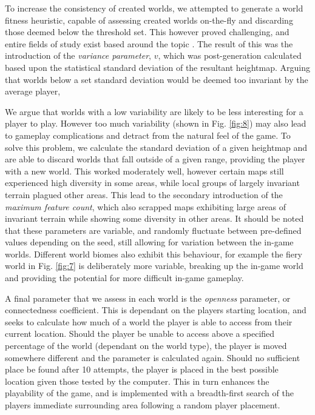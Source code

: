 \documentclass[12pt,a4paper]{article}
\begin{document}


To increase the consistency of created worlds, we attempted to generate a world fitness heuristic, capable of assessing created worlds on-the-fly and discarding those deemed below the threshold set. This however proved challenging, and entire fields of study exist based around the topic \cite{togelius2011search}. The result of this was the introduction of the \emph{variance parameter}, $v$, which was post-generation calculated based upon the statistical standard deviation of the resultant heightmap. Arguing that worlds below a set standard deviation would be deemed too invariant by the average player, 

We argue that worlds with a low variability are likely to be less interesting for a player to play. However too much variability (shown in Fig. \ref{fig:8}) may also lead to gameplay complications and detract from the natural feel of the game. To solve this problem, we calculate the standard deviation of a given heightmap and are able to discard worlds that fall outside of a given range, providing the player with a new world. This worked moderately well, however certain maps still experienced high diversity in some areas, while local groups of largely invariant terrain plagued other areas. This lead to the secondary introduction of the \emph{maximum feature count}, which also scrapped maps exhibiting large areas of invariant terrain while showing some diversity in other areas. It should be noted that these parameters are variable, and randomly fluctuate between pre-defined values depending on the seed, still allowing for variation between the in-game worlds. Different world biomes also exhibit this behaviour, for example the fiery world in Fig. \ref{fig:7} is deliberately more variable, breaking up the in-game world and providing the potential for more difficult in-game gameplay. 

A final parameter that we assess in each world is the \emph{openness} parameter, or connectedness coefficient. This is dependant on the players starting location, and seeks to calculate how much of a world the player is able to access from their current location. Should the player be unable to access above a specified percentage of the world (dependant on the world type), the player is moved somewhere different and the parameter is calculated again. Should no sufficient place be found after 10 attempts, the player is placed in the best possible location given those tested by the computer. This in turn enhances the playability of the game, and is implemented with a breadth-first search of the players immediate surrounding area following a random player placement. 
\end{document}

